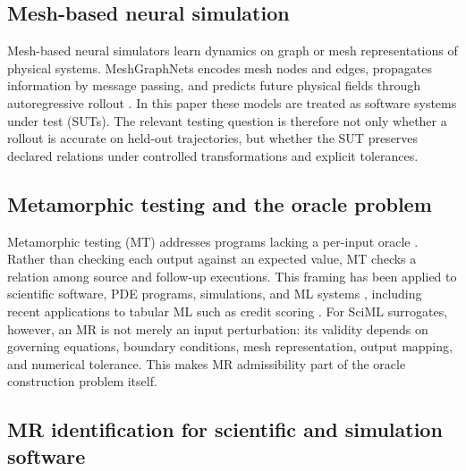 \documentclass[preprint,12pt]{elsarticle}
\begin{document}
\subsection{Mesh-based neural simulation}
\label{subsec:mesh-simulation}

Mesh-based neural simulators learn dynamics on graph or mesh representations of physical systems. MeshGraphNets encodes mesh nodes and edges, propagates information by message passing, and predicts future physical fields through autoregressive rollout \citep{pfaff2021meshgraphnets}. In this paper these models are treated as software systems under test (SUTs). The relevant testing question is therefore not only whether a rollout is accurate on held-out trajectories, but whether the SUT preserves declared relations under controlled transformations and explicit tolerances.

\subsection{Metamorphic testing and the oracle problem}
\label{subsec:mt-oracle}

Metamorphic testing (MT) addresses programs lacking a per-input oracle \citep{chen1998metamorphic,segura2016survey,chen2018mtSurvey}. Rather than checking each output against an expected value, MT checks a relation among source and follow-up executions. This framing has been applied to scientific software, PDE programs, simulations, and ML systems \citep{chen2002pde,chen2011ml,kanewala2019scientific,olsen2019simulation}, including recent applications to tabular ML such as credit scoring \citep{ying2025}. For SciML surrogates, however, an MR is not merely an input perturbation: its validity depends on governing equations, boundary conditions, mesh representation, output mapping, and numerical tolerance. This makes MR admissibility part of the oracle construction problem itself.

\subsection{MR identification for scientific and simulation software}
\label{subsec:mr-identification}
\end{document}
